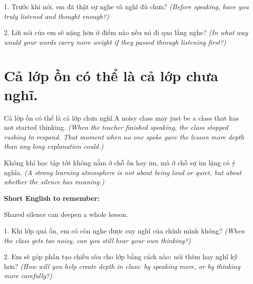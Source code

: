 \begin{tuhocnhanh}
1. Trước khi nói, em đã thật sự nghe và nghĩ đủ chưa? \textit{(Before speaking, have you truly listened and thought enough?)}

2. Lời nói của em sẽ nặng hơn ở điểm nào nếu nó đi qua lắng nghe? \textit{(In what way would your words carry more weight if they passed through listening first?)}
\end{tuhocnhanh}
\ngancach


\section{Cả lớp ồn có thể là cả lớp chưa nghĩ.}
\begin{truyen}{Cả lớp ồn có thể là cả lớp chưa nghĩ.}{A noisy class may just be a class that has not started thinking.}
\textit{(When the teacher finished speaking, the class stopped rushing to respond. That moment when no one spoke gave the lesson more depth than any long explanation could.)}
\end{truyen}

\begin{baihoc}
Không khí học tập tốt không nằm ở chỗ ồn hay im, mà ở chỗ sự im lặng có ý nghĩa.
\textit{(A strong learning atmosphere is not about being loud or quiet, but about whether the silence has meaning.)}
\end{baihoc}

\begin{ghinhoanh}
\textbf{Short English to remember:}

Shared silence can deepen a whole lesson.

\end{ghinhoanh}

\begin{tuhocnhanh}
1. Khi lớp quá ồn, em có còn nghe được suy nghĩ của chính mình không? \textit{(When the class gets too noisy, can you still hear your own thinking?)}

2. Em sẽ góp phần tạo chiều sâu cho lớp bằng cách nào: nói thêm hay nghĩ kỹ hơn? \textit{(How will you help create depth in class: by speaking more, or by thinking more carefully?)}
\end{tuhocnhanh}
\ngancach
